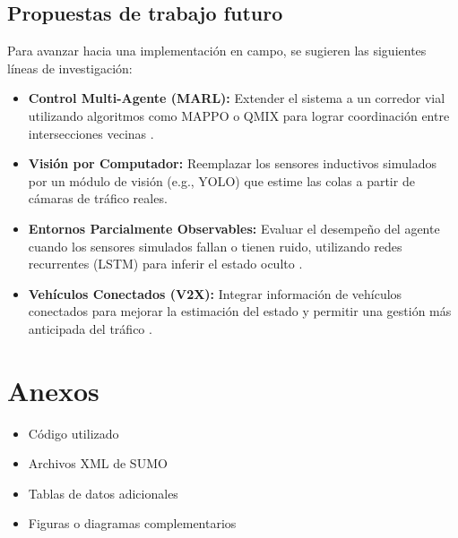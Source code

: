 \documentclass[12pt, a4paper]{report}
\begin{document}
\section{Propuestas de trabajo futuro}
Para avanzar hacia una implementación en campo, se sugieren las siguientes líneas de investigación:

\begin{itemize}
    \item \textbf{Control Multi-Agente (MARL):} Extender el sistema a un corredor vial utilizando algoritmos como MAPPO o QMIX para lograr coordinación entre intersecciones vecinas \cite{48}.
    \item \textbf{Visión por Computador:} Reemplazar los sensores inductivos simulados por un módulo de visión (e.g., YOLO) que estime las colas a partir de cámaras de tráfico reales.
    \item \textbf{Entornos Parcialmente Observables:} Evaluar el desempeño del agente cuando los sensores simulados fallan o tienen ruido, utilizando redes recurrentes (LSTM) para inferir el estado oculto \cite{45}.
    \item \textbf{Vehículos Conectados (V2X):} Integrar información de vehículos conectados para mejorar la estimación del estado y permitir una gestión más anticipada del tráfico \cite{50}.
\end{itemize}

\appendix
\chapter{Anexos}
\begin{itemize}
    \item[A.] Código utilizado
    \item[B.] Archivos XML de SUMO
    \item[C.] Tablas de datos adicionales
    \item[D.] Figuras o diagramas complementarios
\end{itemize}
\end{document}
